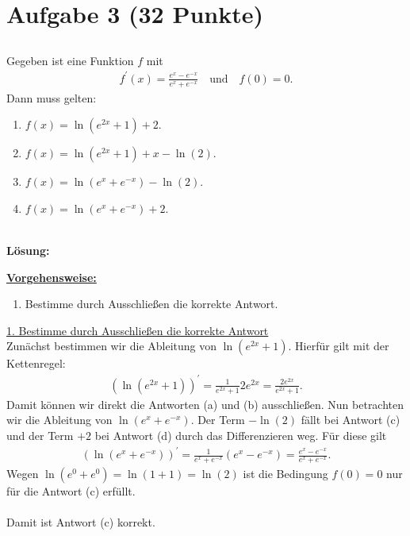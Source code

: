 \section*{Aufgabe 3 (32 Punkte)}
\vspace{0.4cm}
\subsection*{}
Gegeben ist eine Funktion $ f $ mit 
\begin{align*}
f^\prime(x) = \frac{e^x - e^{-x}}{e^x + e^{-x}} \quad \textrm{und} \quad f(0 )= 0.
\end{align*}
Dann muss gelten:
\renewcommand{\labelenumi}{(\alph{enumi})}
\begin{enumerate}
	\item 
	$ f(x) = \ln(e^{2x} + 1) + 2 $.
	\item
	$ f(x) = \ln(e^{2x} + 1) + x  - \ln(2)$.
	\item
	$ f(x) = \ln(e^{x} + e^{-x})  - \ln(2)$.
	\item
	$ f(x) = \ln(e^{x} + e^{-x})  +2$.
\end{enumerate}
\ \\
\textbf{Lösung:}
\begin{mdframed}
\underline{\textbf{Vorgehensweise:}}
\renewcommand{\labelenumi}{\theenumi.}
\begin{enumerate}
\item Bestimme durch Ausschließen die korrekte Antwort.
\end{enumerate}
\end{mdframed}

\underline{1. Bestimme durch Ausschließen die korrekte Antwort}\\
Zunächst bestimmen wir die Ableitung von $ \ln(e^{2x} + 1) $.
Hierfür gilt mit der Kettenregel:
\begin{align*}
\left(\ln(e^{2x} + 1)\right)^\prime
=
\frac{1}{e^{2x} + 1} 2e^{2x}
=\frac{2e^{2x}}{e^{2x} + 1}.
\end{align*}
Damit können wir direkt die Antworten (a) und (b) ausschließen.
Nun betrachten wir die Ableitung von $ \ln(e^x + e^{-x}) $.
Der Term $ - \ln(2) $ fällt bei Antwort (c) und der Term $ +2 $ bei Antwort (d) durch das Differenzieren weg.
Für diese gilt
\begin{align*}
\left(\ln(e^x + e^{-x}) \right)^\prime
=
\frac{1}{e^x + e^{-x}}(e^x - e^{-x})
=
\frac{e^x - e^{-x}}{e^x + e^{-x}}.
\end{align*}
Wegen $ \ln(e^0 + e^{0}) = \ln(1 + 1) = \ln(2) $ ist die Bedingung $ f(0 ) = 0 $ nur für die Antwort (c) erfüllt.\\
\\
Damit ist Antwort (c) korrekt.\\
\\


